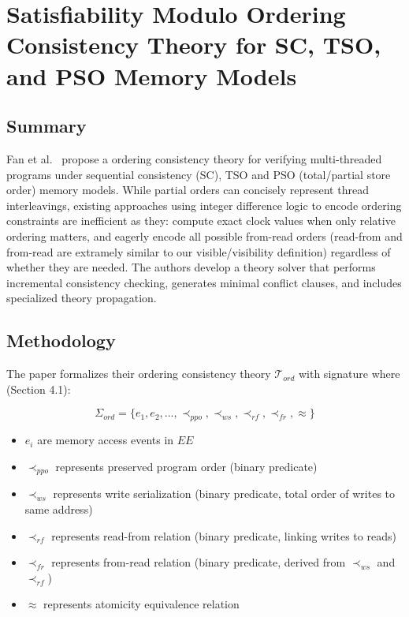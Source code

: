 {  \section{Satisfiability Modulo Ordering Consistency Theory for SC,
  TSO, and PSO Memory Models}

  \subsection{Summary}

  Fan et al.~\cite{fan2023satisfiability} propose a ordering
  consistency theory for
  verifying multi-threaded programs under sequential consistency
  (SC), TSO and PSO
  (total/partial store order) memory models. While partial orders can concisely
  represent thread interleavings, existing approaches using integer difference
  logic to encode ordering constraints are inefficient as they: compute exact
  clock values when only relative ordering matters, and eagerly encode all
  possible from-read orders (read-from and from-read are extramely
    similar to our
  visible/visibility definition) regardless of whether they are needed. The
  authors develop a theory solver that performs incremental
  consistency checking,
  generates minimal conflict clauses, and includes specialized theory
  propagation.

  \subsection{Methodology}

  The paper formalizes their ordering consistency theory
  $\mathcal{T}_{ord}$ with
  signature where (Section 4.1):

  $$
  \Sigma_{ord} = \{ e_1, e_2, ..., \prec_{ppo}, \prec_{ws},
  \prec_{rf}, \prec_{fr}, \approx \}
  $$

  \begin{itemize}
    \item $e_i$ are memory access events in $EE$
    \item $\prec_{ppo}$ represents preserved program order (binary predicate)
    \item $\prec_{ws}$ represents write serialization (binary predicate, total
      order of writes to same address)
    \item $\prec_{rf}$ represents read-from relation (binary predicate,
      linking writes to reads)
    \item $\prec_{fr}$ represents from-read relation (binary predicate,
      derived from $\prec_{ws}$ and $\prec_{rf}$)
    \item $\approx$ represents atomicity equivalence relation
  \end{itemize}

}
